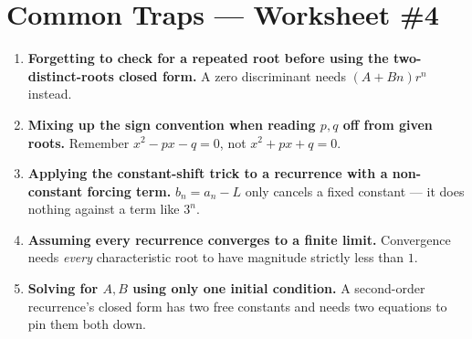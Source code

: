\documentclass[11pt,a4paper]{article}
\begin{document}
\section*{Common Traps --- Worksheet \#4}
\begin{enumerate}[leftmargin=2em,itemsep=4pt]
  \item \textbf{Forgetting to check for a repeated root before using the two-distinct-roots closed form.} A zero discriminant needs $(A+Bn)r^n$ instead. 
  \item \textbf{Mixing up the sign convention when reading $p,q$ off from given roots.} Remember $x^2-px-q=0$, not $x^2+px+q=0$. 
  \item \textbf{Applying the constant-shift trick to a recurrence with a non-constant forcing term.} $b_n=a_n-L$ only cancels a fixed constant --- it does nothing against a term like $3^n$. 
  \item \textbf{Assuming every recurrence converges to a finite limit.} Convergence needs \emph{every} characteristic root to have magnitude strictly less than $1$. 
  \item \textbf{Solving for $A,B$ using only one initial condition.} A second-order recurrence's closed form has two free constants and needs two equations to pin them both down. 
\end{enumerate}

\end{document}
